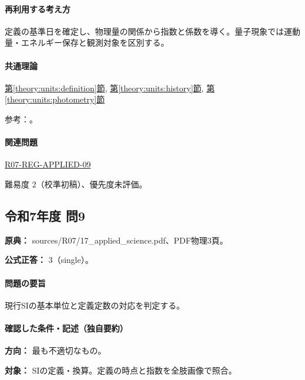 \paragraph{再利用する考え方} 定義の基準日を確定し、物理量の関係から指数と係数を導く。量子現象では運動量・エネルギー保存と観測対象を区別する。

\paragraph{共通理論} \hyperref[theory:units:definition]{第\ref*{theory:units:definition}節}, \hyperref[theory:units:history]{第\ref*{theory:units:history}節}, \hyperref[theory:units:photometry]{第\ref*{theory:units:photometry}節}

\par 参考：\cite{si_cgpm2018,si_brochure9}。

\paragraph{関連問題} \hyperref[q:r07-reg-applied-09]{R07-REG-APPLIED-09}

\par 難易度 2（校準初稿）、優先度未評価。

\subsection{令和7年度 問9}
\label{q:r07-reg-applied-09}

\noindent\textbf{原典：} sources/R07/17\_applied\_science.pdf、PDF物理3頁。

\textbf{公式正答：} 3（single）。

\paragraph{問題の要旨} 現行SIの基本単位と定義定数の対応を判定する。

\paragraph{確認した条件・記述（独自要約）}\mbox{}\par

\noindent\textbf{方向：} 最も不適切なもの。\par

\noindent\textbf{対象：} SIの定義・換算。定義の時点と指数を全肢画像で照合。\par

